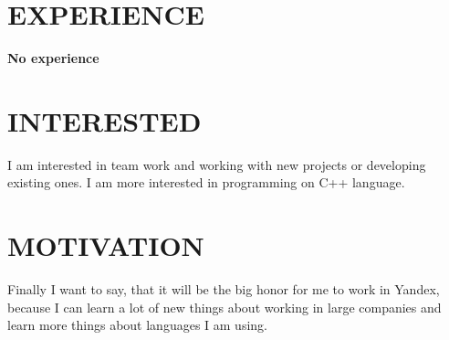 \documentclass[margin]{res}
\begin{document}
\begin{resume}

\section{EXPERIENCE}

\textbf{No experience}

\section{INTERESTED}

I am interested in team work and working with new projects or developing existing ones. I am more interested in programming on C++ language.

\section{MOTIVATION}

Finally I want to say, that it will be the big honor for me to work in Yandex, because I can learn a lot of new things about working in large companies and learn more things about languages I am using.

\end{resume}
\end{document}
